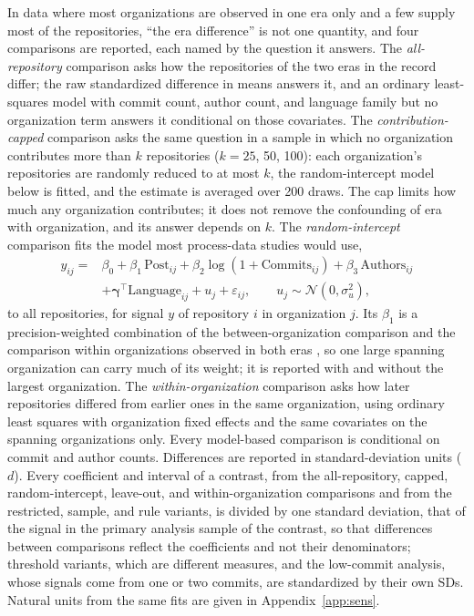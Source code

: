 \documentclass[acmsmall,screen,review,anonymous]{acmart}
\begin{document}
In data where most organizations are observed in one era only and a few supply most of the repositories, ``the era difference'' is not one quantity, and four comparisons are reported, each named by the question it answers. The \textit{all-repository} comparison asks how the repositories of the two eras in the record differ; the raw standardized difference in means answers it, and an ordinary least-squares model with commit count, author count, and language family but no organization term answers it conditional on those covariates. The \textit{contribution-capped} comparison asks the same question in a sample in which no organization contributes more than $k$ repositories ($k = 25$, 50, 100): each organization's repositories are randomly reduced to at most $k$, the random-intercept model below is fitted, and the estimate is averaged over 200 draws. The cap limits how much any organization contributes; it does not remove the confounding of era with organization, and its answer depends on $k$. The \textit{random-intercept} comparison fits the model most process-data studies would use,
\begin{equation}
\begin{split}
y_{ij} = {}& \beta_0 + \beta_1\,\mathrm{Post}_{ij} + \beta_2 \log(1 + \mathrm{Commits}_{ij}) + \beta_3\,\mathrm{Authors}_{ij} \\
& + \boldsymbol{\gamma}^\top \mathrm{Language}_{ij} + u_j + \varepsilon_{ij}, \qquad u_j \sim \mathcal{N}(0, \sigma_u^2),
\end{split}
\label{eq:era}
\end{equation}
to all repositories, for signal $y$ of repository $i$ in organization $j$. Its $\beta_1$ is a precision-weighted combination of the between-organization comparison and the comparison within organizations observed in both eras \citep{raudenbush2002hlm, yaremych2023centering}, so one large spanning organization can carry much of its weight; it is reported with and without the largest organization. The \textit{within-organization} comparison asks how later repositories differed from earlier ones in the same organization, using ordinary least squares with organization fixed effects and the same covariates on the spanning organizations only. Every model-based comparison is conditional on commit and author counts. Differences are reported in standard-deviation units ($d$). Every coefficient and interval of a contrast, from the all-repository, capped, random-intercept, leave-out, and within-organization comparisons and from the restricted, sample, and rule variants, is divided by one standard deviation, that of the signal in the primary analysis sample of the contrast, so that differences between comparisons reflect the coefficients and not their denominators; threshold variants, which are different measures, and the low-commit analysis, whose signals come from one or two commits, are standardized by their own SDs. Natural units from the same fits are given in Appendix~\ref{app:sens}.
\end{document}
